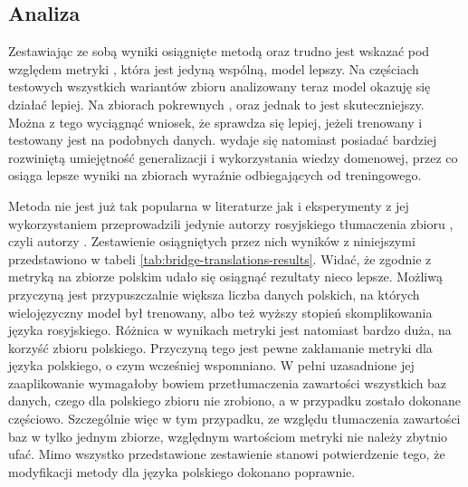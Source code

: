\subsection{Analiza}
Zestawiając ze sobą wyniki osiągnięte metodą  oraz  trudno jest wskazać pod względem metryki , która jest jedyną wspólną, model lepszy. Na częściach testowych wszystkich wariantów zbioru  analizowany teraz model  okazuję się działać lepiej. Na zbiorach pokrewnych ,  oraz  jednak to  jest skuteczniejszy. Można z tego wyciągnąć wniosek, że  sprawdza się lepiej, jeżeli trenowany i testowany jest na podobnych danych.  wydaje się natomiast posiadać bardziej rozwiniętą umiejętność generalizacji i wykorzystania wiedzy domenowej, przez co osiąga lepsze wyniki na zbiorach wyraźnie odbiegających od treningowego. 

Metoda  nie jest już tak popularna w literaturze jak  i eksperymenty z jej wykorzystaniem przeprowadzili jedynie autorzy rosyjskiego tłumaczenia zbioru , czyli autorzy . Zestawienie osiągniętych przez nich wyników z niniejszymi przedstawiono w tabeli \ref{tab:bridge-translations-results}. Widać, że zgodnie z metryką  na zbiorze polskim udało się osiągnąć rezultaty nieco lepsze. Możliwą przyczyną jest przypuszczalnie większa liczba danych polskich, na których wielojęzyczny model  był trenowany, albo też wyższy stopień skomplikowania języka rosyjskiego. Różnica w wynikach metryki  jest natomiast bardzo duża, na korzyść zbioru polskiego. Przyczyną tego jest pewne zakłamanie metryki  dla języka polskiego, o czym wcześniej wspomniano. W pełni uzasadnione jej zaaplikowanie wymagałoby bowiem przetłumaczenia zawartości wszystkich baz danych, czego dla polskiego zbioru nie zrobiono, a w przypadku  zostało dokonane częściowo. Szczególnie więc w tym przypadku, ze względu tłumaczenia zawartości baz w tylko jednym zbiorze, względnym wartościom metryki  nie należy zbytnio ufać. Mimo wszystko przedstawione zestawienie stanowi potwierdzenie tego, że modyfikacji metody  dla języka polskiego dokonano poprawnie.

